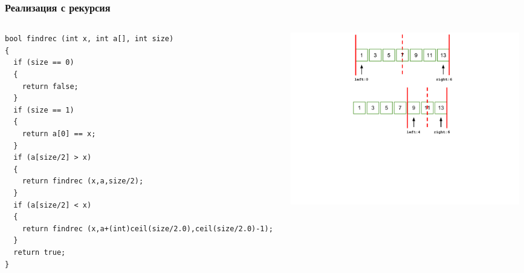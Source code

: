 \documentclass{beamer}
\begin{document}
\begin{frame}[fragile]
\frametitle{Реализация с рекурсия}



\begin{columns}[t]
  \begin{column}{0.5\textwidth}

\begin{lstlisting}
bool findrec (int x, int a[], int size)
{
  if (size == 0)
  {
    return false;
  }
  if (size == 1)
  {
    return a[0] == x;
  }
  if (a[size/2] > x)
  {
    return findrec (x,a,size/2);
  }
  if (a[size/2] < x)
  {
    return findrec (x,a+(int)ceil(size/2.0),ceil(size/2.0)-1);
  }
  return true;
}
\end{lstlisting}


  \end{column}
  \begin{column}{0.5\textwidth}
\vspace*{-1pt}
\hspace*{-50pt}
\includegraphics[width=10cm]{images/binsearch_smaller} 

  \end{column}
\end{columns}



\end{frame}
\end{document}
